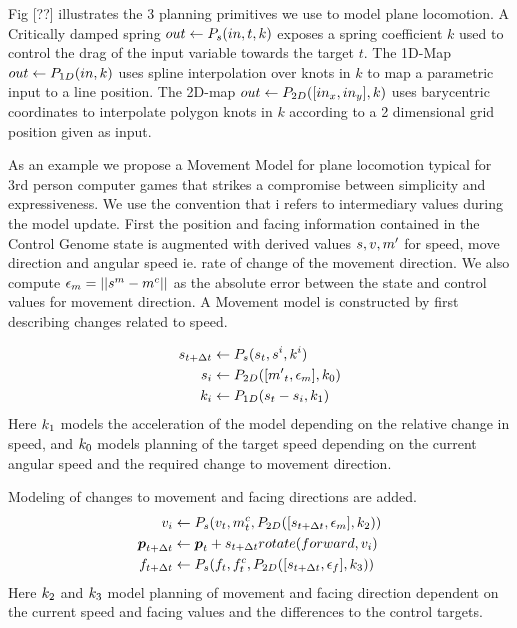 Fig [??] illustrates the 3 planning primitives we use to model plane locomotion. A Critically damped spring $out\leftarrow{}P_s{(in,t,k)}$ exposes a spring coefficient $k$ used to control the drag of the input variable towards the target $t$. The 1D-Map $out\leftarrow{}P_{1D}(in,k)$ uses spline interpolation over knots in $k$ to map a parametric input to a line position. The 2D-map $out\leftarrow{}P_{2D}([in_x, in_y], k)$ uses barycentric coordinates to interpolate polygon knots in $k$ according to a 2 dimensional grid position given as input.    

As an example we propose a Movement Model for plane locomotion typical for 3rd person computer games that strikes a compromise between simplicity and expressiveness. We use the convention that i refers to intermediary values during the model update. First the position and facing information contained in the Control Genome state is augmented with derived values $s, v, {m'}$ for speed, move direction and angular speed ie. rate of change of the movement direction. We also compute $\epsilon_m=||s^m-m^c||$ as the absolute error between the state and control values for movement direction. A Movement model is constructed by first describing changes related to speed.

\begin{subequations}
\begin{align}
    s_{t+\Delta{t}}&\leftarrow{}P_s(s_t,s^i,k^i)\\
    s_i&\leftarrow{}P_{2D}([{m'}_t,\epsilon_m],k_0)\\
    k_i&\leftarrow{}P_{1D}(s_t-s_i, k_1)
\end{align}
\end{subequations}
Here $k_1$ models the acceleration of the model depending on the relative change in speed, and $k_0$ models planning of the target speed depending on the current angular speed and the required change to movement direction.

Modeling of changes to movement and facing directions are added.
\begin{subequations}
\begin{align}
    v_i&\leftarrow P_s(v_t,m^c_t,P_{2D}([s_{t+\Delta{t}},\epsilon_m], k_2))\\ 
    \boldsymbol{p }_{t+\Delta{t}}&\leftarrow{}\boldsymbol{p }_t+s_{t+\Delta{t}}{}rotate(forward,v_i)\\
    f_{t+\Delta{t}}&\leftarrow P_s(f_t,f^c_t,P_{2D}([s_{t+\Delta{t}},\epsilon_f], k_3))
\end{align}
\end{subequations}
Here $k_2$ and $k_3$ model planning of movement and facing direction dependent on the current speed and facing values and the differences to the control targets.

